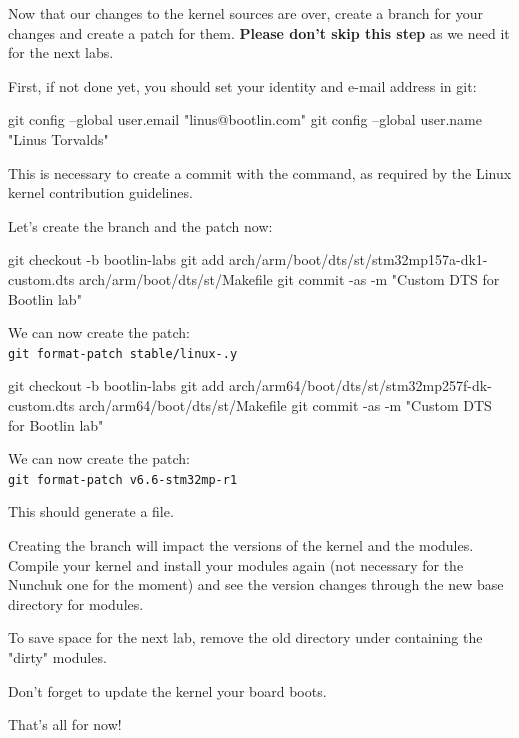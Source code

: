 Now that our changes to the kernel sources are over,
create a branch for your changes and create a patch for them.
{\bf Please don't skip this step} as we need it for the next labs.

First, if not done yet, you should set your identity
and e-mail address in git:

\begin{bashinput}
git config --global user.email "linus@bootlin.com"
git config --global user.name "Linus Torvalds"
\end{bashinput}

This is necessary to create a commit with the 
command, as required by the Linux kernel contribution guidelines.

Let's create the branch and the patch now:

\if{}
      \begin{bashinput}
      git checkout -b bootlin-labs
      git add arch/arm/boot/dts/st/stm32mp157a-dk1-custom.dts arch/arm/boot/dts/st/Makefile
      git commit -as -m "Custom DTS for Bootlin lab"
      \end{bashinput}

      We can now create the patch:\\
      \texttt{git format-patch stable/linux-\workingkernel.y}
\fi
\if{}
      \begin{bashinput}
      git checkout -b bootlin-labs
      git add arch/arm64/boot/dts/st/stm32mp257f-dk-custom.dts arch/arm64/boot/dts/st/Makefile
      git commit -as -m "Custom DTS for Bootlin lab"
      \end{bashinput}
      
      We can now create the patch:\\
      \texttt{git format-patch v6.6-stm32mp-r1}
\fi

This should generate a 
file.

Creating the branch will impact the versions of the kernel and the modules.
Compile your kernel and install your modules again (not necessary for the
Nunchuk one for the moment) and see the version changes through the
new base directory for modules.

To save space for the next lab, remove the old directory under
 containing the "dirty" modules.

Don't forget to update the kernel your board boots.

That's all for now!
